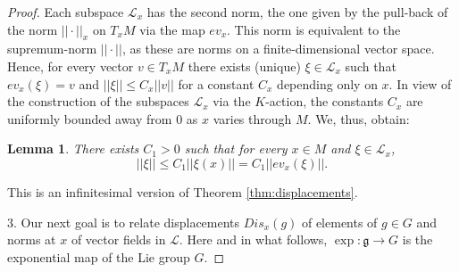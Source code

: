 \documentclass[12pt]{amsbook}%
\newtheorem{lem}[thm]{Lemma}
\theoremstyle{definition}
\theoremstyle{remark}
\numberwithin{section}{chapter}
\numberwithin{subsection}{section}
\numberwithin{figure}{chapter}
\def\eps{\epsilon}
\def\cL{{\mathscr{L}}}
\def\mini{\scriptsize}
\begin{document}
{{\begin{proof}
\medskip 
Each subspace $\cL_x$ has the second norm, the one given by the pull-back of the norm $||\cdot||_x$ on $T_xM$ via the map $ev_x$. 
This norm is equivalent to the supremum-norm $||\cdot||$, as these are norms on a finite-dimensional vector space. 
Hence, for every vector $v\in T_xM$ there exists (unique) $\xi\in \cL_x$ such that $ev_x(\xi)=v$ and 
$||\xi||\leqslant C_x ||v||$ for a constant $C_x$ depending only on $x$.  In view of the construction of the subspaces $\cL_x$ via the $K$-action, 
the constants $C_x$ are uniformly bounded away from $0$ as $x$ varies through $M$. We, thus, obtain:

 \begin{lem}\label{lem:E1}
There exists $C_1>0$ such that for every $x\in M$ and $\xi\in \cL_x$, 
$$
||\xi|| \leqslant C_1 ||\xi(x)||=C_1 ||ev_x(\xi)||. 
$$
\end{lem}  

This is an infinitesimal version of Theorem \ref{thm:displacements}. 



3. Our next goal is to relate displacements $Dis_x(g)$ of elements of $g\in G$ and norms at $x$ of vector fields in $\cL$. Here and in what follows, $\exp:  
{\mathfrak g}\to G$ is the exponential map of the Lie group $G$. 



\end{proof}}}
\end{document}
